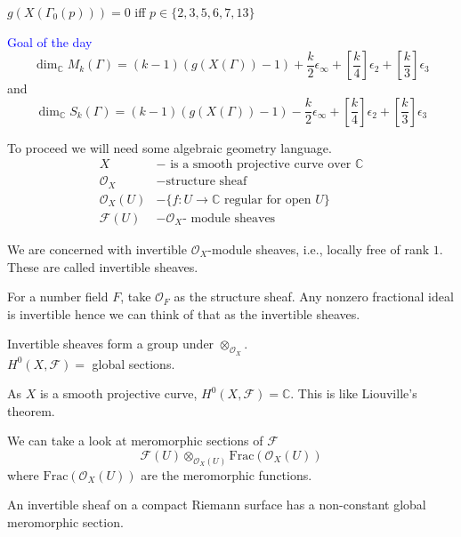 \documentclass[oneside, 12pt]{scrbook}
\newcommand{\CC}{\mathbb C}
\theoremstyle{theorem}
\begin{document}
\begin{exercise}
$g(X(\Gamma_{0}(p)))=0$ iff $p \in \{2,3,5,6,7,13\}$
\end{exercise}

\textcolor{Blue}{Goal of the day} $$\dim_{\CC} M_{k}(\Gamma) = (k-1)(g(X(\Gamma))-1) + \frac{k}{2} \epsilon_{\infty} + \left[\frac{k}{4} \right]\epsilon_{2} + \left[ \frac{k}{3} \right]\epsilon_{3}$$ and $$\dim_{\CC} S_{k}(\Gamma) = (k-1)(g(X(\Gamma))-1) - \frac{k}{2} \epsilon_{\infty} + \left[\frac{k}{4} \right]\epsilon_{2} + \left[ \frac{k}{3} \right]\epsilon_{3}$$

To proceed we will need some algebraic geometry language. 
\begin{align*}
X &- \text{ is a smooth projective curve over } \CC \\
\mathcal{O}_{X} &- \text{structure sheaf} \\
\mathcal{O}_{X}(U) &- \{f: U \rightarrow \CC \text{ regular for open } U\}\\
\mathcal{F}(U) &- \mathcal{O}_{X}\text{- module sheaves}
\end{align*}

We are concerned with invertible $\mathcal{O}_{X}$-module sheaves, i.e., locally free of rank $1$. These are called invertible sheaves. 

\begin{example}
For a number field $F$, take $\mathcal{O}_{F}$ as the structure sheaf. Any nonzero fractional ideal is invertible hence we can think of that as the invertible sheaves.
\end{example}

Invertible sheaves form a group under $\otimes_{\mathcal{O}_{X}}$. \\

$H^{0}(X, \mathcal{F})=$ global sections. 

\begin{remark}
As $X$ is a smooth projective curve, $H^{0}(X, \mathcal{F})=\CC$. This is like Liouville's theorem.
\end{remark}

We can take a look at meromorphic sections of $\mathcal{F}$ $$\mathcal{F}(U) \otimes_{\mathcal{O}_{X}(U)} \mathrm{Frac}(\mathcal{O}_{X}(U))$$ where $\mathrm{Frac}(\mathcal{O}_{X}(U))$ are the meromorphic functions. 

\begin{theorem}
An invertible sheaf on a compact Riemann surface has a non-constant global meromorphic section.
\end{theorem}
\end{document}
